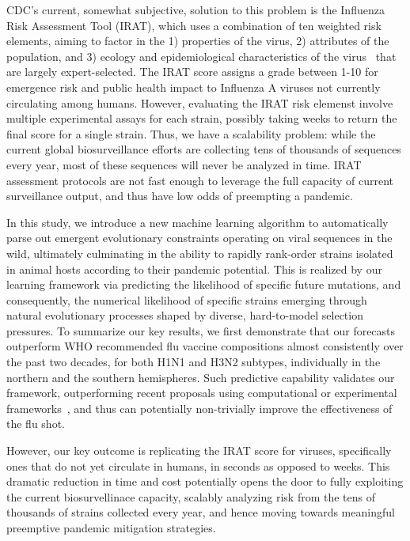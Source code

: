 \documentclass[onecolumn, compsoc,10pt]{IEEEtran}
\begin{document}
CDC's current, somewhat subjective, solution to this problem is the Influenza Risk Assessment Tool (IRAT), which  uses a combination of ten weighted risk elements, aiming to factor in the   1) properties of the virus, 2) attributes of the population, and 3) ecology and epidemiological characteristics of the virus~\cite{Influenz24:online} that are largely  expert-selected. The IRAT score assigns  a grade between 1-10 for emergence risk and public health impact to Influenza A viruses not currently circulating among humans. However, evaluating the IRAT risk elemenst  involve multiple experimental assays for each strain, possibly taking  weeks to return the final   score for a single strain. Thus, we have a scalability problem: while  the current global biosurveillance efforts are collecting tens of thousands of sequences every year, most of these sequences will never be analyzed in time. IRAT assessment protocols are  not fast enough to leverage the full capacity of current surveillance output, and thus have low odds of  preempting a pandemic.


In this study, we introduce a new machine learning algorithm to automatically parse out emergent evolutionary constraints operating on viral sequences in the wild, ultimately culminating in the ability to rapidly rank-order strains isolated in animal hosts according to their pandemic potential. This is realized by our learning framework via predicting the likelihood of specific future  mutations, and  consequently, the numerical likelihood of specific  strains emerging through natural evolutionary processes shaped by diverse, hard-to-model selection pressures.
To summarize our key results, we first demonstrate that our forecasts outperform WHO recommended flu vaccine compositions almost consistently over the past two decades, for both H1N1 and H3N2 subtypes, individually in the northern and the southern hemispheres. Such predictive capability validates our framework, outperforming recent proposals using computational or experimental frameworks~\cite{huddleston2020integrating,neher2014predicting}, and thus can potentially non-trivially improve the effectiveness of the flu shot.

However, our key outcome  is  replicating the IRAT score for  \infl  viruses, specifically ones that do not yet circulate in humans, in seconds as opposed to weeks. This dramatic reduction in time and cost potentially opens the door to fully exploiting the  current biosurvellinace capacity, scalably analyzing risk from  the tens of thousands of strains collected every year, and hence moving towards   meaningful preemptive pandemic mitigation strategies. 
\end{document}
